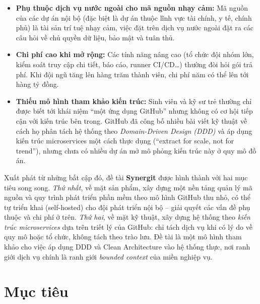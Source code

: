 \begin{itemize}
\item \textbf{Phụ thuộc dịch vụ nước ngoài cho mã nguồn nhạy cảm:} Mã nguồn của các dự án nội bộ (đặc biệt là dự án thuộc lĩnh vực tài chính, y tế, chính phủ) là tài sản trí tuệ nhạy cảm, việc đặt trên dịch vụ nước ngoài đặt ra các câu hỏi về chủ quyền dữ liệu, bảo mật và tuân thủ.
\item \textbf{Chi phí cao khi mở rộng:} Các tính năng nâng cao (tổ chức đội nhóm lớn, kiểm soát truy cập chi tiết, báo cáo, runner CI/CD\ldots) thường đòi hỏi gói trả phí. Khi đội ngũ tăng lên hàng trăm thành viên, chi phí năm có thể lên tới hàng tỷ đồng.
\item \textbf{Thiếu mô hình tham khảo kiến trúc:} Sinh viên và kỹ sư trẻ thường chỉ được biết tới khái niệm ``một ứng dụng GitHub'' nhưng không có cơ hội tiếp cận với kiến trúc bên trong. GitHub đã công bố nhiều bài viết kỹ thuật về cách họ phân tách hệ thống theo \textit{Domain-Driven Design (DDD)} và áp dụng kiến trúc microservices một cách thực dụng (``extract for scale, not for trend''), nhưng chưa có nhiều dự án mở mô phỏng kiến trúc này ở quy mô đồ án.
\end{itemize}

Xuất phát từ những bất cập đó, đề tài \textbf{Synergit} được hình thành với hai mục tiêu song song. \textit{Thứ nhất}, về mặt sản phẩm, xây dựng một nền tảng quản lý mã nguồn và quy trình phát triển phần mềm theo mô hình GitHub thu nhỏ, có thể tự triển khai (self-hosted) cho đội phát triển nội bộ -- giải quyết các vấn đề phụ thuộc và chi phí ở trên. \textit{Thứ hai}, về mặt kỹ thuật, xây dựng hệ thống theo \textit{kiến trúc microservices} dựa trên triết lý của GitHub: chỉ tách dịch vụ khi có lý do về quy mô hoặc tổ chức, không tách theo trào lưu. Đề tài là một mô hình tham khảo cho việc áp dụng DDD và Clean Architecture vào hệ thống thực, nơi ranh giới dịch vụ chính là ranh giới \textit{bounded context} của miền nghiệp vụ.

\section{Mục tiêu}

